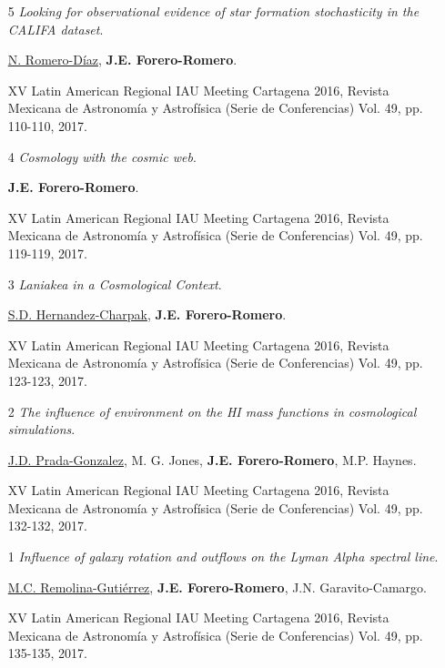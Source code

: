 \documentclass{article}
\begin{document}
\begin{itemize}

\item[5]{\it Looking for observational evidence of star formation
  stochasticity in the CALIFA dataset}.
	
\underline{N. Romero-Díaz},  {\bf J.E. Forero-Romero}.

XV Latin American Regional IAU Meeting Cartagena 2016, Revista Mexicana
de Astronomía y Astrofísica (Serie de Conferencias) Vol. 49,
pp. 110-110, 2017.

\item[4]{\it Cosmology with the cosmic web}.

{\bf J.E. Forero-Romero}.

XV Latin American Regional IAU Meeting Cartagena 2016, Revista Mexicana
de Astronomía y Astrofísica (Serie de Conferencias) Vol. 49,
pp. 119-119, 2017.

\item[3]{\it Laniakea in a Cosmological Context}.


\underline{S.D. Hernandez-Charpak}, {\bf J.E. Forero-Romero}.

XV Latin American Regional IAU Meeting Cartagena 2016, Revista Mexicana
de Astronomía y Astrofísica (Serie de Conferencias) Vol. 49,
pp. 123-123, 2017.


\item[2] {\it The influence of environment on the HI mass functions in
  cosmological simulations}.
 
\underline{J.D. Prada-Gonzalez}, M. G. Jones, {\bf J.E. Forero-Romero}, M.P. Haynes.

XV Latin American Regional IAU Meeting Cartagena 2016, Revista Mexicana
de Astronomía y Astrofísica (Serie de Conferencias) Vol. 49,
pp. 132-132, 2017.

\item [1] {\it Influence of galaxy rotation and outflows on the Lyman
  Alpha spectral line}. 
	
\underline{M.C. Remolina-Gutiérrez}, {\bf J.E. Forero-Romero},
J.N. Garavito-Camargo.

XV Latin American Regional IAU Meeting Cartagena 2016, Revista Mexicana
de Astronomía y Astrofísica (Serie de Conferencias) Vol. 49,
pp. 135-135, 2017.
\end{itemize}
\end{document}
